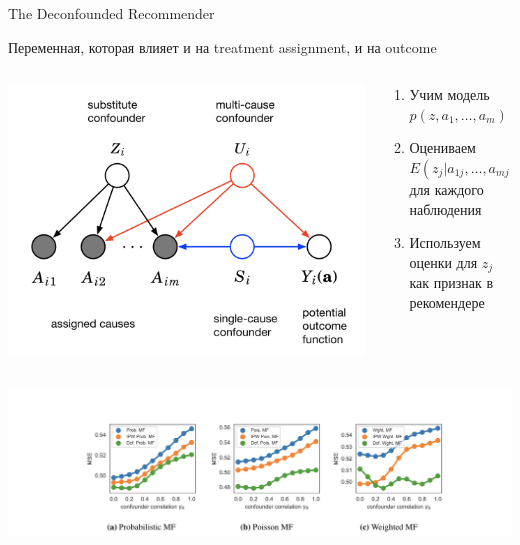 \documentclass[11pt,aspectratio=169]{beamer}
\begin{document}
\begin{frame}{The Deconfounded Recommender \cite{DECONF}}

\vfill

\begin{tcolorbox}[colback=gray!5,colframe=gray!80,title=Confounder]
Переменная, которая влияет и на treatment assignment, и на outcome
\end{tcolorbox}

\begin{columns}
\begin{column}{0.4\textwidth}
\begin{center}
\includegraphics[scale=0.2]{images/blessings.png}
\end{center}
\end{column}

\begin{column}{0.5\textwidth}
\begin{enumerate}
\item Учим модель $p(z, a_1, \ldots, a_m)$
\item Оцениваем $E(z_j | a_{1j}, \ldots, a_{mj})$ для каждого наблюдения
\item Используем оценки для $z_j$ как признак в рекомендере
\end{enumerate}
\end{column}
\end{columns}

\end{frame}

\begin{frame}

\begin{center}
\includegraphics[scale=0.6]{images/deconf-result.png}
\end{center}

\end{frame}
\end{document}
